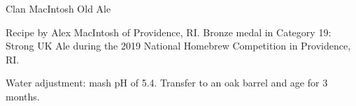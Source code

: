 \stylesection{\styleoldale}

\begin{recipe}{Clan MacIntosh Old Ale}

\begin{aboutblock}
Recipe by Alex MacIntosh of Providence, RI. Bronze medal in Category 19: Strong
UK Ale during the 2019 National Homebrew Competition in Providence, RI. \sourceaha
\end{aboutblock}


\begin{methodandtiming}
 
\begin{mashsteps}
\end{mashsteps}

\begin{fermentationsteps}
\end{fermentationsteps}

\begin{directions}
Water adjustment: mash pH of 5.4. Transfer to an oak barrel and age for
3 months.
\end{directions}

\end{methodandtiming}

\recipebreak

\begin{ingredientsblock}

\begin{malts}
\end{malts}

\begin{hops}
\end{hops}


\end{ingredientsblock}

\end{recipe}
